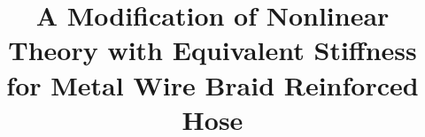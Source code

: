 \title{A Modification of Nonlinear Theory with Equivalent Stiffness for Metal Wire Braid Reinforced Hose}





